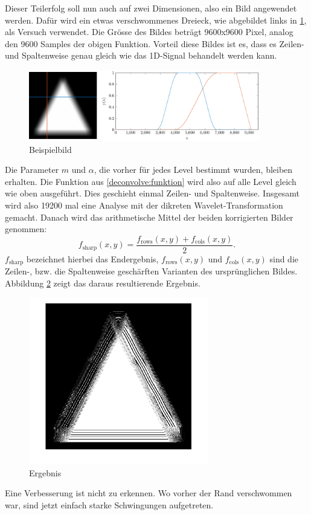Dieser Teilerfolg soll nun auch auf zwei Dimensionen, also ein Bild angewendet werden.
Dafür wird ein etwas verschwommenes Dreieck, wie abgebildet links in \ref{deconvolve:example}, als Versuch verwendet.
Die Grösse des Bildes beträgt 9600x9600 Pixel, analog den 9600 Samples der obigen Funktion.
Vorteil diese Bildes ist es, dass es Zeilen- und Spaltenweise genau gleich wie das 1D-Signal behandelt werden kann.
\begin{figure}[h]
\centering
\includegraphics[width=0.9\textwidth]{./papers/deconvolve/pictures/dreieck.pdf}
\caption{Beispielbild\label{deconvolve:example}}
\end{figure}

Die Parameter $m$ und $\alpha$, die vorher für jedes Level bestimmt wurden, bleiben erhalten.
Die Funktion aus \eqref{deconvolve:funktion} wird also auf alle Level gleich wie oben ausgeführt.
Dies geschieht einmal Zeilen- und Spaltenweise.
Insgesamt wird also 19200 mal eine Analyse mit der dikreten Wavelet-Transformation gemacht.
Danach wird das arithmetische Mittel der beiden korrigierten Bilder genommen:
$$f_\text{sharp}(x,y)=\frac{f_\text{rows}(x,y)+f_\text{cols}(x,y)}{2}.$$
$f_\text{sharp}$ bezeichnet hierbei das Endergebnis, $f_\text{rows}(x,y)$ und $f_\text{cols}(x,y)$ sind die Zeilen-, bzw. die Spaltenweise \glqq geschärften\grqq{} Varianten des ursprünglichen Bildes.
Abbildung \ref{deconvolve:ergebnis} zeigt das daraus resultierende Ergebnis.
\begin{figure}[h]
\centering
\includegraphics[width=0.7\textwidth]{./papers/deconvolve/pictures/dreieck_sharp.png}
\caption{Ergebnis\label{deconvolve:ergebnis}}
\end{figure}
 
Eine Verbesserung ist nicht zu erkennen. Wo vorher der Rand verschwommen war, sind jetzt einfach starke Schwingungen aufgetreten.
